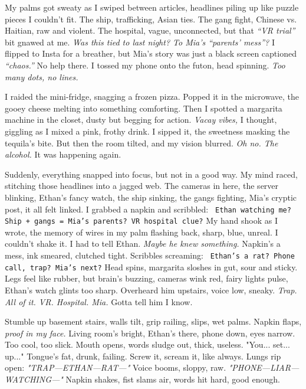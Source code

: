 \documentclass[12pt]{article} %
\newcommand{\note}[1]{\texttt{\small \color{DarkGray} #1}}
\begin{document}
My palms got sweaty as I swiped between articles, headlines piling up like puzzle pieces I couldn’t fit. The ship, trafficking, Asian ties. The gang fight, Chinese vs. Haitian, raw and violent. The hospital, vague, unconnected, but that \textit{“VR trial”} bit gnawed at me. \textit{Was this tied to last night? To \textnormal{Mia}’s “parents’ mess”?} I flipped to Insta for a breather, but \textnormal{Mia}’s story was just a black screen captioned \textit{“chaos.”} No help there. I tossed my phone onto the futon, head spinning. \textit{Too many dots, no lines.}

I raided the mini-fridge, snagging a frozen pizza. Popped it in the microwave, the gooey cheese melting into something comforting. Then I spotted a margarita machine in the closet, dusty but begging for action. \textit{Vacay vibes,} I thought, giggling as I mixed a pink, frothy drink. I sipped it, the sweetness masking the tequila’s bite. But then the room tilted, and my vision blurred. \textit{Oh no. The alcohol.} It was happening again.

Suddenly, everything snapped into focus, but not in a good way. My mind raced, stitching those headlines into a jagged web. The cameras in here, the server blinking, \textnormal{Ethan}’s fancy watch, the ship sinking, the gangs fighting, \textnormal{Mia}’s cryptic post, it all felt linked. I grabbed a napkin and scribbled: \note{Ethan watching me? Ship + gangs = Mia’s parents? VR hospital clue?} My hand shook as I wrote, the memory of wires in my palm flashing back, sharp, blue, unreal. I couldn’t shake it. I had to tell \textnormal{Ethan}. \textit{Maybe he knew something.} Napkin’s a mess, ink smeared, clutched tight. Scribbles screaming: \note{Ethan’s a rat? Phone call, trap? Mia’s next?} Head spins, margarita sloshes in gut, sour and sticky. Legs feel like rubber, but brain’s buzzing, cameras wink red, fairy lights pulse, \textnormal{Ethan}’s watch glints too sharp. Overheard him upstairs, voice low, sneaky. \textit{Trap. All of it. VR. Hospital. Mia.} Gotta tell him I know.

Stumble up basement stairs, walls tilt, grip railing, slips, wet palms. Napkin flaps, \textit{proof in my face.} Living room’s bright, \textnormal{Ethan}’s there, phone down, eyes narrow. Too cool, too slick. Mouth opens, words sludge out, thick, useless. "You... set... up..." Tongue’s fat, drunk, failing. Screw it, scream it, like always. Lungs rip open: \textit{"TRAP—ETHAN—RAT—"} Voice booms, sloppy, raw. \textit{"PHONE—LIAR—WATCHING—"} Napkin shakes, fist slams air, words hit hard, good enough.
\end{document}
